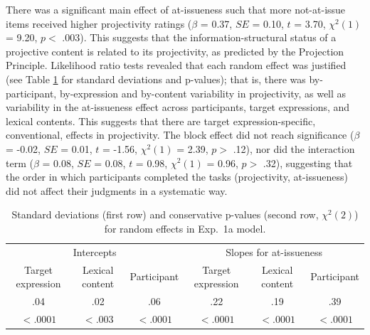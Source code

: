 \documentclass[11pt,fleqn]{article}
\newcommand{\6}{\mbox{$[\hspace*{-.6mm}[$}}
\newcommand{\9}{\mbox{$]\hspace*{-.6mm}]$}}
\newcommand{\tableref}[1]{Table \ref{#1}}
\begin{document}
There was a significant main effect of at-issueness such that more not-at-issue items received higher projectivity ratings ($\beta$ = 0.37, $SE$ = 0.10, $t$ = 3.70, $\chi^2(1)$ = 9.20, $p <$ .003). This suggests that the information-structural status of a projective content is related to its projectivity, as predicted by the Projection Principle. Likelihood ratio tests revealed that each random effect was justified (see \tableref{tab:random1a} for standard deviations and p-values); that is, there was by-participant, by-expression and by-content variability in projectivity, as well as variability in the at-issueness effect across participants, target expressions, and lexical contents. This suggests that there are target expression-specific, conventional, effects in projectivity. The block effect did not reach significance ($\beta$ = -0.02, $SE$ = 0.01, $t$ = -1.56, $\chi^2(1)$ = 2.39, $p >$ .12), nor did the interaction term ($\beta$ = 0.08, $SE$ = 0.08, $t$ = 0.98, $\chi^2(1)$ = 0.96, $p >$ .32), suggesting that the order in which participants completed the tasks (projectivity, at-issueness) did not affect their judgments in a systematic way. 


\begin{table}
\caption{Standard deviations (first row) and conservative p-values (second row, $\chi^2(2)$) for random effects in Exp.~1a model.}
\begin{tabular}{c c c c c c }
\toprule
\multicolumn{3}{c}{Intercepts} & \multicolumn{3}{c}{Slopes for at-issueness}\\
Target expression & Lexical content & Participant & Target expression & Lexical content & Participant\\
\midrule
.04 & .02 & .06 & .22 & .19 & .39\\
$< .0001$ & $< .003$ & $< .0001$ & $< .0001$ & $< .0001$ & $< .0001$ \\
\bottomrule
\end{tabular}
\label{tab:random1a}
\end{table}
\end{document}
